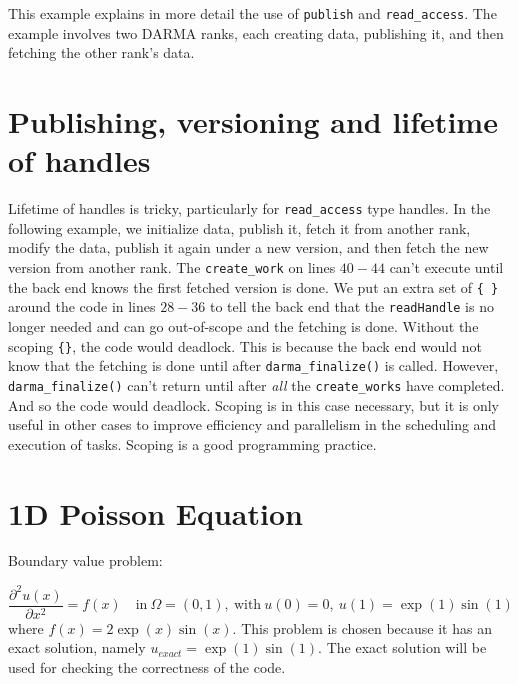 This example explains in more detail the use of \texttt{publish} 
and \texttt{read\_access}. The example involves two DARMA ranks, each creating 
data, publishing it, and then fetching the other rank's data.








\section{Publishing, versioning and lifetime of handles}

Lifetime of handles is tricky, particularly for \texttt{read\_access} type handles.  
In the following example, we initialize data, publish it, fetch it from another rank, 
modify the data, publish it again under a new version, and then fetch the new version from another rank. 
The \texttt{create\_work} on lines $40-44$ can't execute until the back end knows the first fetched version is done.
We put an extra set of \texttt{\{ \}} around the code in lines $28-36$ to tell the back end that 
the \texttt{readHandle} is no longer needed and can go out-of-scope and the fetching is done.  
Without the scoping \texttt{\{\}}, the code would deadlock. This is because the back end would not know that 
the fetching is done until after \texttt{darma\_finalize()} is called. However, \texttt{darma\_finalize()} 
can't return until after {\it all} the \texttt{create\_works} have completed.  And so the code would deadlock. 
Scoping is in this case necessary, but it is only useful in other cases to improve efficiency and parallelism 
in the scheduling and execution of tasks. Scoping is a good programming practice.










\section{1D Poisson Equation}

Boundary value problem:

\begin{equation} 
  \frac{\partial^2 u(x)}{\partial x^2} = f(x) \quad 
  \text{in} \ \Omega=(0,1), \ \text{with} 
  \ u(0)=0, \ u(1)=\exp{(1)}\sin{(1)}
\end{equation} 
where $f(x)=2\exp{(x)}\sin{(x)}$. This problem is chosen because 
it has an exact solution, namely $u_{exact} = \exp{(1)}\sin{(1)}$. 
The exact solution will be used for checking the correctness 
of the code.

